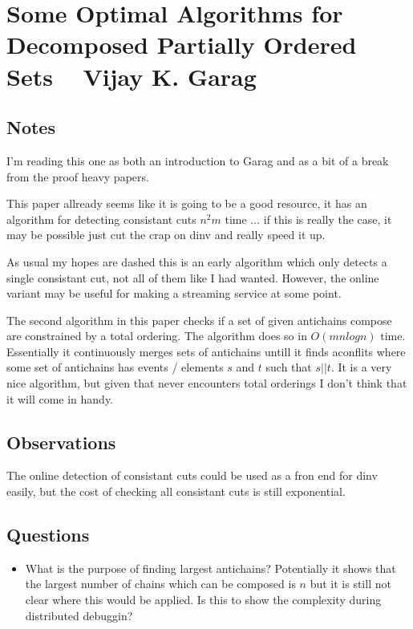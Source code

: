 \section{Some Optimal Algorithms for Decomposed Partially Ordered Sets \
\small{ Vijay K. Garag}}

\subsection{Notes}

I'm reading this one as both an introduction to Garag and as a bit of a break
from the proof heavy papers.

This paper allready seems like it is going to be a good resource, it has an
algorithm for detecting consistant cuts $n^2m$ time $\dots$ if this is really
the case, it may be possible just cut the crap on dinv and really speed it up.


As usual my hopes are dashed this is an early algorithm which only detects a
single consistant cut, not all of them like I had wanted. However, the online
variant may be useful for making \dinv a streaming service at some point.

The second algorithm in this paper checks if a set of given antichains compose
are constrained by a total ordering. The algorithm does so in $O(mn log n)$
time. Essentially it continuously merges sets of antichains untill it finds
aconflits where some set of antichains has events / elements $s$ and $t$ such
that $s || t $. It is a very nice algorithm, but given that \dinv never
encounters total orderings I don't think that it will come in handy.

\subsection{Observations}

The online detection of consistant cuts could be used as a fron end for dinv
easily, but the cost of checking all consistant cuts is still exponential.

\subsection{Questions}

\begin{itemize}

\item What is the purpose of finding largest antichains? Potentially it shows that the largest number of chains which can be composed is $n$ but it is still not clear where this would be applied. Is this to show the complexity during distributed debuggin?

\end{itemize}
